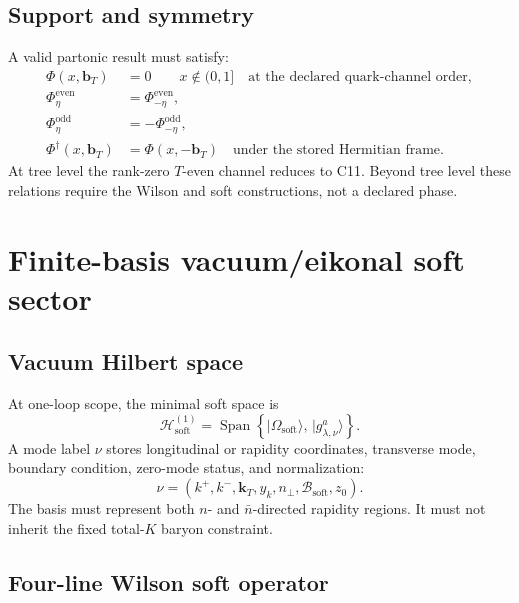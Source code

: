 \documentclass[11pt]{article}
\newcommand{\Span}{\operatorname{Span}}
\newcommand{\bT}{\bm b_T}
\newcommand{\kT}{\bm k_T}
\newcommand{\cB}{\mathcal B}
\newcommand{\cH}{\mathcal H}
\newcommand{\Soft}{\ensuremath{\mathrm{soft}}}
\begin{document}
\subsection{Support and symmetry}

A valid partonic result must satisfy:
\begin{align}
 \Phi(x,\bT)&=0\qquad x\notin(0,1]\quad\text{at the declared quark-channel order},\\
 \Phi_{\eta}^{\mathrm{even}}&=\Phi_{-\eta}^{\mathrm{even}},\\
 \Phi_{\eta}^{\mathrm{odd}}&=-\Phi_{-\eta}^{\mathrm{odd}},\\
 \Phi^\dagger(x,\bT)&=\Phi(x,-\bT)
 \quad\text{under the stored Hermitian frame}.
 \label{eq:coll-symmetries}
\end{align}
At tree level the rank-zero \(T\)-even channel reduces to C11.  Beyond tree level these relations require the Wilson and soft constructions, not a declared phase.

\section{Finite-basis vacuum/eikonal soft sector}
\label{sec:soft-sector}

\subsection{Vacuum Hilbert space}

At one-loop scope, the minimal soft space is
\begin{equation}
 \cH_{\Soft}^{(1)}
 =
 \Span\left\{
 |\Omega_{\Soft}\rangle,\,
 |g^a_{\lambda,\nu}\rangle
 \right\}.
 \label{eq:soft-one-gluon-space}
\end{equation}
A mode label \(\nu\) stores longitudinal or rapidity coordinates, transverse mode, boundary condition, zero-mode status, and normalization:
\begin{equation}
 \nu
 =
 \left(
 k^+,k^-,\kT,
 y_k,
 n_{\perp},
 \cB_{\Soft},
 z_0
 \right).
 \label{eq:soft-mode}
\end{equation}
The basis must represent both \(n\)- and \(\bar n\)-directed rapidity regions.  It must not inherit the fixed total-\(K\) baryon constraint.

\subsection{Four-line Wilson soft operator}
\end{document}
